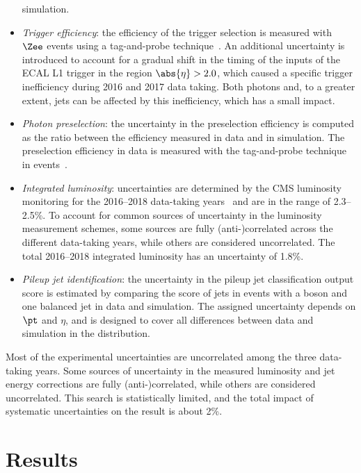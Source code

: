 \documentclass[11pt,a4paper,cmspaper,final,collab]{cms-tdr}
\begin{document}
\begin{itemize}
simulation.
\item \textit{Trigger efficiency}: 
  the efficiency of the trigger selection is measured with 
  $\Zee$ events using a tag-and-probe technique~\cite{CMS:2011aa}. An additional uncertainty is introduced to account for a 
  gradual shift in the timing of the inputs of the ECAL L1 trigger in the region $\abs{\eta} > 2.0$, 
  which caused a specific trigger inefficiency during 2016 and 2017 data taking. 
  Both photons and, to a greater extent, jets can be affected by this inefficiency, which has a small impact. 
\item \textit{Photon preselection}: 
  the uncertainty in the preselection efficiency
  is computed as the ratio between the efficiency measured in data and in simulation. The preselection efficiency in data is measured with the tag-and-probe technique in \Zee events~\cite{CMS:2011aa}.
\item \textit{Integrated luminosity}: 
  uncertainties are determined by the CMS luminosity monitoring 
  for the 2016--2018 data-taking years~\cite{CMSlumi2016,CMSlumi2017,CMSlumi2018} and are in the range of 2.3--2.5\%. To account for common sources of uncertainty in the luminosity measurement schemes, some sources are fully (anti-)correlated across the different data-taking years, while others are considered uncorrelated. The total 2016--2018 integrated luminosity has an uncertainty of 1.8\%.
\item \textit{Pileup jet identification}: 
  the uncertainty in the pileup jet classification output score is estimated by
  comparing the score of jets in events with a \PZ boson and one balanced jet
  in data and simulation. The assigned uncertainty depends on $\pt$ and $\eta$, and is designed to cover all differences between data and simulation in the distribution.
\end{itemize}

Most of the experimental uncertainties are uncorrelated among the three data-taking years. Some sources of uncertainty in the measured luminosity and jet energy corrections are fully (anti-)correlated, while others are considered uncorrelated.
This search is statistically limited, and the total impact of systematic uncertainties on the result is about 2\%. 



\section{Results}
\label{sec:res}
\end{document}
